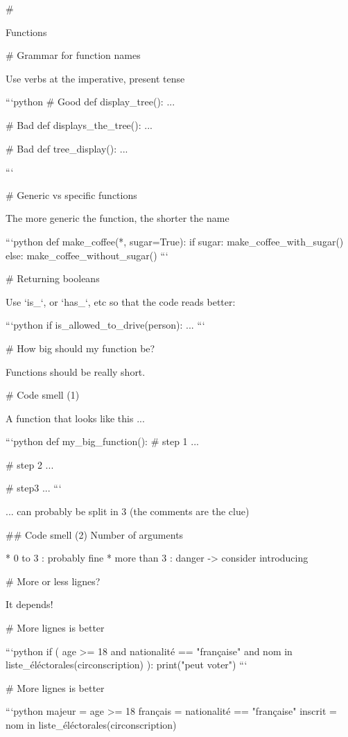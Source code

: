 #

\huge \center Functions


# Grammar for function names

Use verbs at the imperative, present tense

```python
# Good
def display_tree():
    ...

# Bad
def displays_the_tree():
    ...

# Bad
def tree_display():
    ...

```

# Generic vs specific functions

The more generic the function, the shorter the name

```python
def make_coffee(*, sugar=True):
    if sugar:
        make_coffee_with_sugar()
   else:
        make_coffee_without_sugar()
```



# Returning booleans

Use `is_`, or `has_`, etc so that the code reads better:

```python
if is_allowed_to_drive(person):
    ...
```

# How big should my function be?

Functions should be really short.

# Code smell (1)

A function that looks like this ...

```python
def my_big_function():
    # step 1
    ...

    # step 2
    ...

    # step3
    ...
```

... can probably be split in 3 (the comments are the clue)

## Code smell (2)  Number of arguments

* 0 to 3 : probably fine
* more than 3 : danger -> consider introducing


 # More or less lignes?

\center \large It depends!

# More lignes is better

```python
if (
    age >= 18
    and nationalité == "française"
    and nom in liste_éléctorales(circonscription)
):
    print("peut voter")
```

# More lignes is better

```python
majeur = age >= 18
français = nationalité == "française"
inscrit = nom in liste_éléctorales(circonscription)

